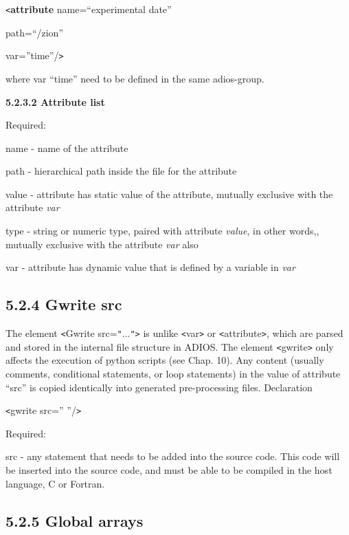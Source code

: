 \texttt{<}\textbf{attribute} name=``experimental date'' 

\leftskip=27pt
\parindent=43pt
path=``/zion''

var=''time''/\texttt{>}

\leftskip=0pt
\parindent=0pt
where var ``time'' need to be defined in the same adios-group.

\textbf{5.2.3.2 Attribute list}

Required:\label{HToc82067522}

\leftskip=18pt
\parindent=3pt
name -  name of the attribute

path - hierarchical path inside the file for the attribute

value - attribute has static value of the attribute, mutually exclusive with the 
attribute \textit{var}

type - string or numeric type, paired with attribute \textit{value}, in other words,, 
mutually exclusive with the attribute \textit{var} also

var - attribute has dynamic value that is defined by a variable in \textit{var\label{HToc84890246}\label{HToc212016622}\label{HToc212016864}\label{HToc182553369}}

\subsection*{{\large \textbf{5.2.4 Gwrite src}}}

\leftskip=0pt
\parindent=0pt
The element \texttt{<}Gwrite src=\texttt{"}...\texttt{"}\texttt{>} is unlike \texttt{<}var\texttt{>} 
or \texttt{<}attribute\texttt{>}, which are parsed and stored in the internal file 
structure in ADIOS. The element \texttt{<}gwrite\texttt{>} only affects the execution 
of python scripts (see Chap. 10). Any content (usually comments, conditional statements, 
or loop statements) in the value of attribute ``src'' is copied identically into 
generated pre-processing files. Declaration

\texttt{<}gwrite src=''    ''/\texttt{>}

Required:

\leftskip=18pt
\parindent=3pt
src -  any statement that needs to be added into the source code. This code will 
be inserted into the source code, and must be able to be compiled in the host language, 
C or Fortran. \label{HToc84890247}\label{HToc212016623}\label{HToc212016865}\label{HRef278371183}\label{HToc182553370}

\subsection*{{\large \textbf{5.2.5 Global arrays}}}

